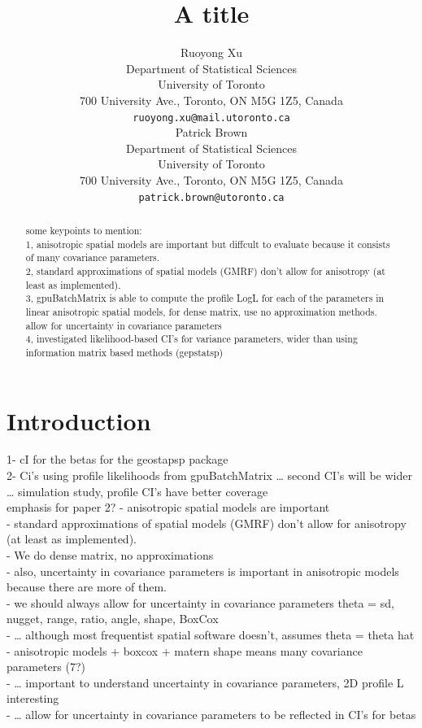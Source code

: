 \documentclass{article}\usepackage[]{graphicx}\usepackage[]{color}
\title{A title}
\date{}
\author{
  Ruoyong Xu\\
  Department of Statistical Sciences\\
  University of Toronto\\
  700 University Ave., Toronto, ON M5G 1Z5, Canada\\
  \texttt{ruoyong.xu@mail.utoronto.ca} \\
   \And
  Patrick Brown\\
  Department of Statistical Sciences\\
  University of Toronto\\
  700 University Ave., Toronto, ON M5G 1Z5, Canada\\
  \texttt{patrick.brown@utoronto.ca} \\
}
\begin{document}
\maketitle
{}



\begin{abstract}
some keypoints to mention:\\
1, anisotropic spatial models are important but diffcult to evaluate because it consists of many covariance parameters.\\
2, standard approximations of spatial models (GMRF) don’t allow for anisotropy (at least as implemented). \\
3, gpuBatchMatrix is able to compute the profile LogL for each of the parameters in linear anisotropic spatial models, for dense matrix, use no approximation methods. allow for uncertainty in covariance parameters\\
4, investigated likelihood-based CI’s for variance parameters, wider than using information matrix based methods (gepstatsp)\\
\end{abstract}




\section{Introduction}
1- cI for the betas for the geostapsp package\\
2- Ci’s using profile likelihoods from gpuBatchMatrix
… second CI’s will be wider\\
… simulation study, profile CI’s have better coverage\\


emphasis for paper 2?
- anisotropic spatial models are important\\
- standard approximations of spatial models (GMRF) don’t allow for anisotropy (at least as implemented).  \\
- We do dense matrix, no approximations\\
- also, uncertainty in covariance parameters is important in anisotropic models because there are more of them.\\


- we should always allow for uncertainty in covariance parameters theta = sd, nugget, range, ratio, angle, shape, BoxCox\\
- … although most frequentist spatial software doesn’t, assumes theta = theta hat\\
- anisotropic models + boxcox + matern shape means many covariance parameters (7?)\\
- … important to understand uncertainty in covariance parameters, 2D profile L interesting\\
- … allow for uncertainty in covariance parameters to be reflected in CI’s for betas\\
\end{document}
